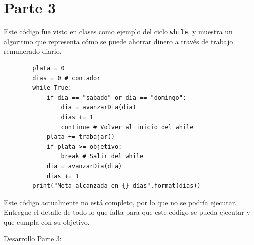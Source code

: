 \documentclass{article}
\newcommand{\note}[1]{\todo[inline,color=gray!20!white]{#1}}
\newcommand{\code}[1]{\texttt{#1}}
\begin{document}
\newpage
\section*{Parte 3}
Este código fue visto en clases como ejemplo del ciclo \code{while}, y muestra un algoritmo que representa cómo se puede ahorrar dinero a través de trabajo remunerado diario.

    \begin{verbatim}
        plata = 0
        dias = 0 # contador
        while True:
            if dia == "sabado" or dia == "domingo":
                dia = avanzarDia(dia)
                dias += 1
                continue # Volver al inicio del while
            plata += trabajar()
            if plata >= objetivo:
                break # Salir del while
            dia = avanzarDia(dia)
            dias += 1
        print("Meta alcanzada en {} días".format(dias))
    \end{verbatim}

Este código actualmente no está completo, por lo que no se podría ejecutar. Entregue el detalle de todo lo que falta para que este código se pueda ejecutar y que cumpla con su objetivo. 

\vspace{1cm}
\note{Tiempo: 2 horas.}

\newpage
Desarrollo Parte 3: 
\end{document}
